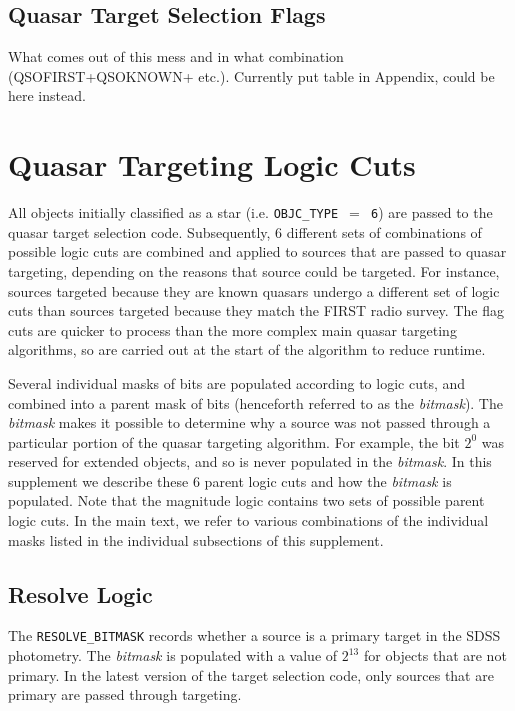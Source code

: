 \documentclass{emulateapj}
\begin{document}
\subsection{Quasar Target Selection Flags}

What comes out of this mess and in what combination (QSOFIRST+QSOKNOWN+
etc.). Currently put table in Appendix, could be here instead.


\appendix

\section{Quasar Targeting Logic Cuts}
\label{sec:app1}
\newcommand{\fb}{{\em bitmask }}
\newcommand{\fbpunc}{{\em bitmask}}


All objects initially classified as a star (i.e. {\tt OBJC\_TYPE $=$
6}) are passed to the quasar target selection code. Subsequently, 6
different sets of combinations of possible logic cuts are combined and
applied to sources that are passed to quasar targeting, depending on the
reasons that source could be targeted. For instance, sources targeted
because they are known quasars undergo a different set of logic cuts
than sources targeted because they match the FIRST radio survey. The
flag cuts are quicker to process than the more complex main quasar
targeting algorithms, so are carried out at the start of the algorithm
to reduce runtime.

Several individual masks of bits are populated according to logic cuts,
and combined into a parent mask of bits (henceforth referred to as the
\fbpunc). The \fb makes it possible to determine why a source was not
passed through a particular portion of the quasar targeting algorithm.
For example, the bit $2^0$ was reserved for extended objects, and so is
never populated in the \fbpunc. In this supplement we describe these 6
parent logic cuts and how the \fb is populated. Note that the magnitude
logic contains two sets of possible parent logic cuts. In the main text,
we refer to various combinations of the individual masks listed in the
individual subsections of this supplement.

\subsection{Resolve Logic}
	The {\tt RESOLVE\_BITMASK} records whether a source is a primary target in the SDSS photometry. The \fb is populated with a value of $2^{13}$ for objects that are not primary. In the latest version of the target selection code, only sources that are primary are passed through targeting.
	
\end{document}
